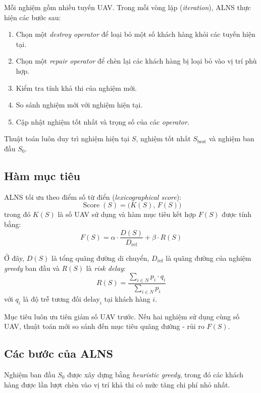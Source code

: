 \documentclass{article}
\begin{document}
Mỗi nghiệm gồm nhiều tuyến UAV. Trong mỗi vòng lặp (\textit{iteration}), ALNS thực hiện các bước sau:
\begin{enumerate}
    \item Chọn một \textit{destroy operator} để loại bỏ một số khách hàng khỏi các tuyến hiện tại.
    \item Chọn một \textit{repair operator} để chèn lại các khách hàng bị loại bỏ vào vị trí phù hợp.
    \item Kiểm tra tính khả thi của nghiệm mới.
    \item So sánh nghiệm mới với nghiệm hiện tại.
    \item Cập nhật nghiệm tốt nhất và trọng số của các \textit{operator}.
\end{enumerate}

Thuật toán luôn duy trì nghiệm hiện tại $S$, nghiệm tốt nhất $S_{\text{best}}$ và nghiệm ban đầu $S_0$.

\subsection{Hàm mục tiêu}

ALNS tối ưu theo điểm số từ điển (\textit{lexicographical score}):
\begin{equation}
    \operatorname{Score}(S) = \big( K(S), \, F(S) \big)
\end{equation}
trong đó $K(S)$ là số UAV sử dụng và hàm mục tiêu kết hợp $F(S)$ được tính bằng:
\begin{equation}
    F(S) = \alpha \cdot \frac{D(S)}{D_{\text{ref}}} + \beta \cdot R(S)
\end{equation}

Ở đây, $D(S)$ là tổng quãng đường di chuyển, $D_{\text{ref}}$ là quãng đường của nghiệm \textit{greedy} ban đầu và $R(S)$ là \textit{risk delay}:
\begin{equation}
    R(S) = \frac{\sum_{i \in N} p_i \cdot q_i}{\sum_{i \in N} p_i}
\end{equation}
với $q_i$ là độ trễ tương đối $\text{delay}_i$ tại khách hàng $i$.

Mục tiêu luôn ưu tiên giảm số UAV trước. Nếu hai nghiệm sử dụng cùng số UAV, thuật toán mới so sánh đến mục tiêu quãng đường - rủi ro $F(S)$.

\subsection{Các bước của ALNS}

Nghiệm ban đầu $S_0$ được xây dựng bằng \textit{heuristic greedy}, trong đó các khách hàng được lần lượt chèn vào vị trí khả thi có mức tăng chi phí nhỏ nhất.
\end{document}
